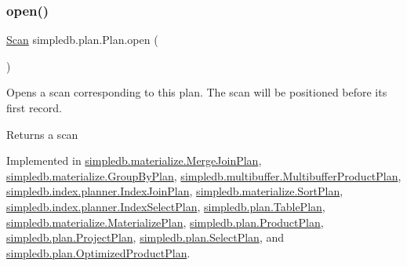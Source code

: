 \mbox{\label{interfacesimpledb_1_1plan_1_1Plan_aaa4c15cda4e9c0d52308850f9f13ff99}} 
\subsubsection{\texorpdfstring{open()}{open()}}
{\footnotesize\ttfamily \hyperlink{interfacesimpledb_1_1query_1_1Scan}{Scan} simpledb.\+plan.\+Plan.\+open (\begin{DoxyParamCaption}{ }\end{DoxyParamCaption})}

Opens a scan corresponding to this plan. The scan will be positioned before its first record. \begin{DoxyReturn}{Returns}
a scan 
\end{DoxyReturn}


Implemented in \hyperlink{classsimpledb_1_1materialize_1_1MergeJoinPlan_aa37bca23bb46556e265de8ed03c0e2e9}{simpledb.\+materialize.\+Merge\+Join\+Plan}, \hyperlink{classsimpledb_1_1materialize_1_1GroupByPlan_a2f4aa5e9b356af297091a27ff2b97343}{simpledb.\+materialize.\+Group\+By\+Plan}, \hyperlink{classsimpledb_1_1multibuffer_1_1MultibufferProductPlan_a0874bcf0d5bb9839346404d40b06eaed}{simpledb.\+multibuffer.\+Multibuffer\+Product\+Plan}, \hyperlink{classsimpledb_1_1index_1_1planner_1_1IndexJoinPlan_ab9c7fc729baa00380ee1a314578f5828}{simpledb.\+index.\+planner.\+Index\+Join\+Plan}, \hyperlink{classsimpledb_1_1materialize_1_1SortPlan_ace1a90e7d7d4b498e0b1c6ef5d30e4a4}{simpledb.\+materialize.\+Sort\+Plan}, \hyperlink{classsimpledb_1_1index_1_1planner_1_1IndexSelectPlan_af1acee7f900bcacf37d2ff1100a31545}{simpledb.\+index.\+planner.\+Index\+Select\+Plan}, \hyperlink{classsimpledb_1_1plan_1_1TablePlan_afb47e9016581a59788ec4de4c672cf76}{simpledb.\+plan.\+Table\+Plan}, \hyperlink{classsimpledb_1_1materialize_1_1MaterializePlan_acf693ce6e3b9e7603286ea4c971e1d51}{simpledb.\+materialize.\+Materialize\+Plan}, \hyperlink{classsimpledb_1_1plan_1_1ProductPlan_a42d2c091a1b387611af9e960783c0931}{simpledb.\+plan.\+Product\+Plan}, \hyperlink{classsimpledb_1_1plan_1_1ProjectPlan_aa63f3cd034d9b00c29210731cc6ff368}{simpledb.\+plan.\+Project\+Plan}, \hyperlink{classsimpledb_1_1plan_1_1SelectPlan_aa18edd10f7bac870ffd458c8da82c5f1}{simpledb.\+plan.\+Select\+Plan}, and \hyperlink{classsimpledb_1_1plan_1_1OptimizedProductPlan_a885a442c4708535114b8e7a8b022a5f7}{simpledb.\+plan.\+Optimized\+Product\+Plan}.

